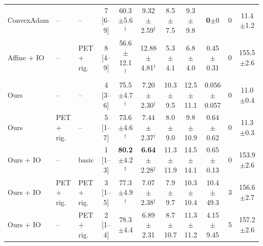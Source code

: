 \begin{table}[t]
{\begin{tabular}{lllcccccccc}
ConvexAdam & -- & -- & 7 [6--9] & 60.3$\pm$5.6$^{\dagger}$ & 9.32$\pm$2.59$^{\dagger}$ & 8.5$\pm$7.5 & 9.3$\pm$9.8 & \textbf{0}$\pm$0 & 0 & 11.4$\pm$1.2 \\
Affine + IO & -- & PET + rig. & 8 [4--9] & 56.6$\pm$12.1$^{\dagger}$ & 12.88$\pm$4.81$^{\dagger}$ & 5.3$\pm$4.1 & 6.8$\pm$4.0 & 0.45$\pm$0.31 & 0 & 155.5$\pm$2.6 \\
\midrule
Ours & -- & -- & 4 [3--6] & 75.5$\pm$4.7$^{\dagger}$ & 7.20$\pm$2.30$^{\dagger}$ & 10.3$\pm$9.5 & 12.5$\pm$11.1 & 0.056$\pm$0.057 & 0 & 11.0$\pm$0.4 \\
Ours & PET + rig. & -- & 5 [1--7] & 73.6$\pm$4.6$^{\dagger}$ & 7.44$\pm$2.37$^{\dagger}$ & 8.0$\pm$9.0 & 9.8$\pm$10.9 & 0.64$\pm$0.62 & 0 & 11.3$\pm$0.3 \\
Ours + IO & -- & basic & 1 [1--3] & \textbf{80.2}$\pm$4.2$^{\ddagger}$ & \textbf{6.64}$\pm$2.28$^{\ddagger}$ & 11.3$\pm$11.9 & 14.5$\pm$14.1 & 0.65$\pm$0.13 & 0 & 153.9$\pm$2.6 \\
Ours + IO & PET + rig. & PET + rig. & 3 [1--5] & 77.3$\pm$4.9$^{\dagger}$ & 7.07$\pm$2.38$^{\dagger}$ & 7.9$\pm$9.7 & 10.3$\pm$10.4 & 10.4$\pm$49.3 & 3 & 156.6$\pm$2.7 \\
Ours + IO & -- & PET + rig. & 2 [1--4] & 78.3$\pm$4.4 & 6.89$\pm$2.31 & 8.7$\pm$10.7 & 11.3$\pm$11.2 & 4.15$\pm$9.45 & 5 & 157.2$\pm$2.6 \\
\bottomrule
\end{tabular}}
\end{table}
